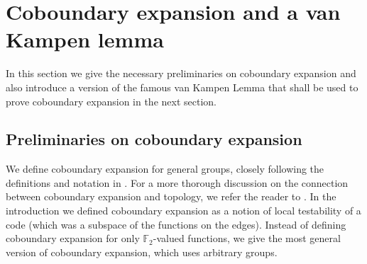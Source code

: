 \documentclass[10pt,a4paper]{article}
\newcommand{\prettyref}[1]{\cref{#1}}
\theoremstyle{definition}
\theoremstyle{remark}
\newcommand{\F}{\mathbb{F}}
\numberwithin{equation}{section}
\let\pref=\prettyref
\begin{document}
\section{Coboundary expansion and a van Kampen lemma} \label{sec:vk-lemma}
In this section we give the necessary preliminaries on coboundary expansion and also introduce a version of the famous van Kampen Lemma \cite{VanKampen1933} that shall be used to prove coboundary expansion in the next section. 
\subsection{Preliminaries on coboundary expansion}
\label{sec:prelim-coboundary}
We define coboundary expansion for general groups, closely following the definitions and notation in \cite{DiksteinD2023cbdry}. For a more thorough discussion on the connection between coboundary expansion and topology, we refer the reader to \cite{DiksteinD2023cbdry}. In the introduction we defined coboundary expansion as a notion of local testability of a code (which was a subspace of the functions on the edges). Instead of defining coboundary expansion for only $\F_2$-valued functions, we give the most general version of coboundary expansion, which uses arbitrary groups.

\end{document}
